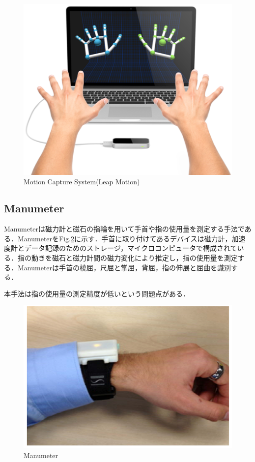 \begin{figure}[H]
  \centering
  \includegraphics[width=0.6\linewidth]{fig/ch1/mcs}
  \caption{Motion Capture System(Leap Motion)}
  \label{fig:Motion Capture System}
\end{figure}

\subsection*{Manumeter}
Manumeter\cite{Friedman2014}は磁力計と磁石の指輪を用いて手首や指の使用量を測定する手法である．ManumeterをFig.\ref{fig:Manumeter}に示す．手首に取り付けてあるデバイスは磁力計，加速度計とデータ記録のためのストレージ，マイクロコンピュータで構成されている．指の動きを磁石と磁力計間の磁力変化により推定し，指の使用量を測定する．Manumeterは手首の橈屈，尺屈と掌屈，背屈，指の伸展と屈曲を識別する．


本手法は指の使用量の測定精度が低いという問題点がある．
\begin{figure}[H]
  \centering
  \includegraphics[width=0.6\linewidth]{fig/ch1/manumeter}
  \caption{Manumeter\cite{Friedman2014}}
  \label{fig:Manumeter}
\end{figure}

